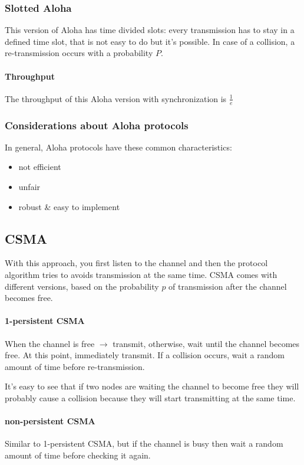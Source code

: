 \subsubsection{Slotted Aloha}

This version of Aloha has time divided slots: every transmission has to stay in
a defined time slot, that is not easy to do but it's possible. In case of a
collision, a re-transmission occurs with a probability $P$.

\paragraph*{Throughput} The throughput of this Aloha version with synchronization
is $\frac{1}{e}$

\subsubsection{Considerations about Aloha protocols}

In general, Aloha protocols have these common characteristics:
\begin{itemize}
\item not efficient
\item unfair
\item robust \& easy to implement
\end{itemize}

\subsection{CSMA}

With this approach, you first listen to the channel and then the protocol
algorithm tries to avoids transmission at the same time. CSMA comes with
different versions, based on the probability $p$ of transmission after the
channel becomes free.

\paragraph*{1-persistent CSMA} When the channel is free $\to$ transmit,
otherwise, wait until the channel becomes free. At this point, immediately
transmit. If a collision occurs, wait a random amount of time before
re-transmission.

It's easy to see that if two nodes are waiting the channel to become free they
will probably cause a collision because they will start transmitting at the
same time.

\paragraph*{non-persistent CSMA} Similar to 1-persistent CSMA, but if the
channel is busy then wait a random amount of time before checking it again.

